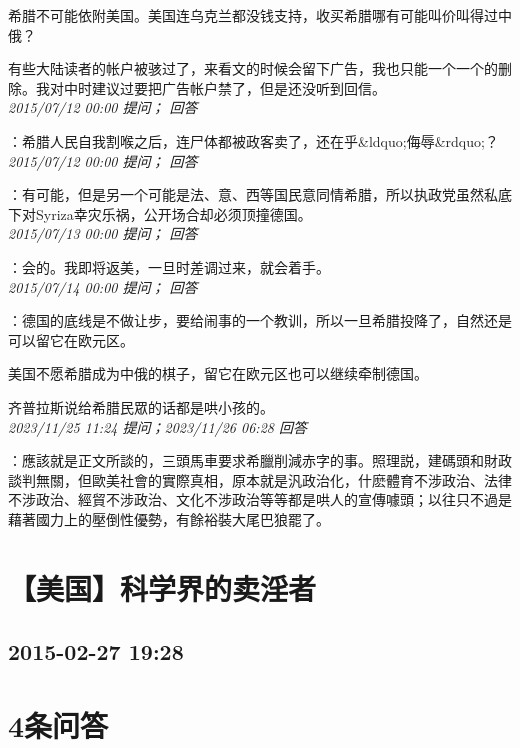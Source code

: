\documentclass[twocolumn]{ctexart}
\begin{document}
希腊不可能依附美国。美国连乌克兰都没钱支持，收买希腊哪有可能叫价叫得过中俄？

有些大陆读者的帐户被骇过了，来看文的时候会留下广告，我也只能一个一个的删除。我对中时建议过要把广告帐户禁了，但是还没听到回信。\\

\textit{\hfill\noindent\small 2015/07/12 00:00 提问； 回答}

：希腊人民自我割喉之后，连尸体都被政客卖了，还在乎\&ldquo;侮辱\&rdquo;？\\

\textit{\hfill\noindent\small 2015/07/12 00:00 提问； 回答}

：有可能，但是另一个可能是法、意、西等国民意同情希腊，所以执政党虽然私底下对Syriza幸灾乐祸，公开场合却必须顶撞德国。\\

\textit{\hfill\noindent\small 2015/07/13 00:00 提问； 回答}

：会的。我即将返美，一旦时差调过来，就会着手。\\

\textit{\hfill\noindent\small 2015/07/14 00:00 提问； 回答}

：德国的底线是不做让步，要给闹事的一个教训，所以一旦希腊投降了，自然还是可以留它在欧元区。

美国不愿希腊成为中俄的棋子，留它在欧元区也可以继续牵制德国。

齐普拉斯说给希腊民眾的话都是哄小孩的。\\

\textit{\hfill\noindent\small 2023/11/25 11:24 提问；2023/11/26 06:28 回答}

：應該就是正文所談的，三頭馬車要求希臘削減赤字的事。照理説，建碼頭和財政談判無關，但歐美社會的實際真相，原本就是汎政治化，什麽體育不涉政治、法律不涉政治、經貿不涉政治、文化不涉政治等等都是哄人的宣傳噱頭；以往只不過是藉著國力上的壓倒性優勢，有餘裕裝大尾巴狼罷了。
\\


\section{【美国】科学界的卖淫者}
\subsection{2015-02-27 19:28}


\section{4条问答}
\end{document}
